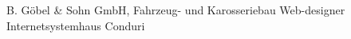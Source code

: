 \section{\internships}\label{sec:internships}
%
{\coachbuilder}
{\newline{}B. Göbel \& Sohn GmbH, Fahrzeug- und Karosseriebau}
{}{}{}
{Web-designer}
{\newline{}Internetsystemhaus Conduri}{}{}{}